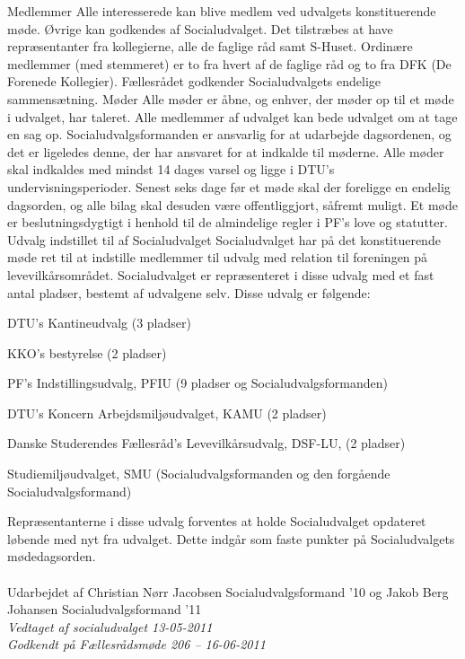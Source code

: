 Medlemmer
Alle interesserede kan blive medlem ved udvalgets konstituerende møde. Øvrige kan godkendes af Socialudvalget. Det
tilstræbes at have repræsentanter fra kollegierne, alle de faglige råd samt S-Huset.
Ordinære medlemmer (med stemmeret) er to fra hvert af de faglige råd og to fra DFK (De Forenede Kollegier).
Fællesrådet godkender Socialudvalgets endelige sammensætning.
Møder
Alle møder er åbne, og enhver, der møder op til et møde i udvalget, har taleret. Alle
medlemmer af udvalget kan bede udvalget om at tage en sag op.
Socialudvalgsformanden er ansvarlig for at udarbejde dagsordenen, og det er ligeledes denne, der har ansvaret for at
indkalde til møderne.
Alle møder skal indkaldes med mindst 14 dages varsel og ligge i DTU’s
undervisningsperioder.
Senest seks dage før et møde skal der foreligge en endelig dagsorden, og alle bilag skal
desuden være offentliggjort, såfremt muligt.
Et møde er beslutningsdygtigt i henhold til de almindelige regler i PF’s love og statutter.
Udvalg indstillet til af Socialudvalget
Socialudvalget har på det konstituerende møde ret til at indstille medlemmer til udvalg med relation til foreningen på
levevilkårsområdet. Socialudvalget er repræsenteret i disse udvalg med et fast antal pladser, bestemt af udvalgene selv.
Disse udvalg er følgende:
\begin{list}{•}
\item DTU’s Kantineudvalg (3 pladser)
\item KKO’s bestyrelse (2 pladser)
\item PF’s Indstillingsudvalg, PFIU (9 pladser og Socialudvalgsformanden)
\item DTU’s Koncern Arbejdsmiljøudvalget, KAMU (2 pladser)
\item Danske Studerendes Fællesråd’s Levevilkårsudvalg, DSF-LU, (2 pladser)
\item Studiemiljøudvalget, SMU (Socialudvalgsformanden og den forgående Socialudvalgsformand)
\end{list}
 
Repræsentanterne i disse udvalg forventes at holde Socialudvalget opdateret løbende med nyt fra udvalget. Dette indgår
som faste punkter på Socialudvalgets mødedagsorden.\\
\\
Udarbejdet af Christian Nørr Jacobsen Socialudvalgsformand ’10 og Jakob Berg Johansen Socialudvalgsformand ’11
\\

\textit{Vedtaget af socialudvalget 13-05-2011}
\\

\textit{Godkendt på Fællesrådsmøde 206 – 16-06-2011}

